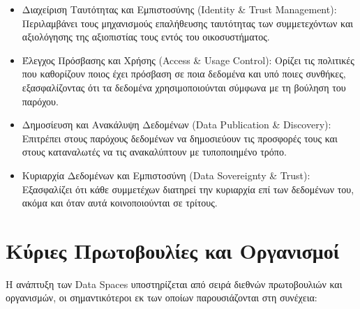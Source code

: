 \begin{itemize}
    \item Διαχείριση Ταυτότητας και Εμπιστοσύνης (\textlatin{Identity \& Trust
    Management}): Περιλαμβάνει τους μηχανισμούς επαλήθευσης ταυτότητας των συμμετεχόντων
    και αξιολόγησης της αξιοπιστίας τους εντός του οικοσυστήματος.

    \item Έλεγχος Πρόσβασης και Χρήσης (\textlatin{Access \& Usage Control}):
    Ορίζει τις πολιτικές που καθορίζουν ποιος έχει πρόσβαση σε ποια δεδομένα και υπό
    ποιες συνθήκες, εξασφαλίζοντας ότι τα δεδομένα χρησιμοποιούνται σύμφωνα με τη
    βούληση του παρόχου.

    \item Δημοσίευση και Ανακάλυψη Δεδομένων (\textlatin{Data Publication \&
    Discovery}): Επιτρέπει στους παρόχους δεδομένων να δημοσιεύουν τις προσφορές τους
    και στους καταναλωτές να τις ανακαλύπτουν με τυποποιημένο τρόπο.

    \item Κυριαρχία Δεδομένων και Εμπιστοσύνη (\textlatin{Data Sovereignty \&
    Trust}): Εξασφαλίζει ότι κάθε συμμετέχων διατηρεί την κυριαρχία επί των δεδομένων
    του, ακόμα και όταν αυτά κοινοποιούνται σε τρίτους.
\end{itemize}

\section{Κύριες Πρωτοβουλίες και Οργανισμοί}
\label{sec:initiatives}

Η ανάπτυξη των \textlatin{Data Spaces} υποστηρίζεται από σειρά διεθνών πρωτοβουλιών
και οργανισμών, οι σημαντικότεροι εκ των οποίων παρουσιάζονται στη συνέχεια:

